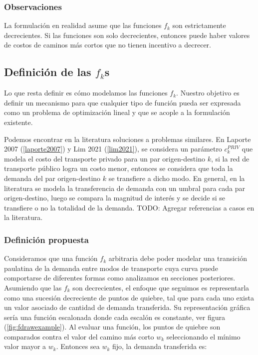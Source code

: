 \documentclass{article}
\begin{document}
  \subsubsection*{Observaciones}

  La formulación en realidad asume que las funciones $f_k$ son estrictamente decrecientes. Si las funciones son solo decrecientes, entonces puede haber valores de costos de caminos más cortos que no tienen incentivo a decrecer.

  \subsection{Definición de las $f_k$s}

  Lo que resta definir es cómo modelamos las funciones $f_k$. Nuestro objetivo es definir un mecanismo para que cualquier tipo de función pueda ser expresada como un problema de optimización lineal y que se acople a la formulación existente.

  Podemos encontrar en la literatura soluciones a problemas similares. En Laporte 2007 (\ref{laporte2007}) y Lim 2021 (\ref{lim2021}), se considera un parámetro $c^{PRIV}_k$ que modela el costo del transporte privado para un par origen-destino $k$, si la red de transporte público logra un costo menor, entonces se considera que toda la demanda del par origen-destino $k$ se transfiere a dicho modo. En general, en la literatura se modela la transferencia de demanda con un umbral para cada par origen-destino, luego se compara la magnitud de interés y se decide si se transfiere o no la totalidad de la demanda. TODO: Agregar referencias a casos en la literatura.

  \subsubsection{Definición propuesta}

  Consideramos que una función $f_k$ arbitraria debe poder modelar una transición paulatina de la demanda entre modos de transporte cuya curva puede comportarse de diferentes formas como analizamos en secciones posteriores. Asumiendo que las $f_k$ son decrecientes, el enfoque que seguimos es representarla como una sucesión decreciente de puntos de quiebre, tal que para cada uno exista un valor asociado de cantidad de demanda transferida. Su representación gráfica sería una función escalonada donde cada escalón es constante, ver figura (\ref{fig:fdrawexample}). Al evaluar una función, los puntos de quiebre son comparados contra el valor del camino más corto $w_k$ seleccionando el mínimo valor mayor a $w_k$. Entonces sea $w_k$ fijo, la demanda transferida es:
\end{document}
